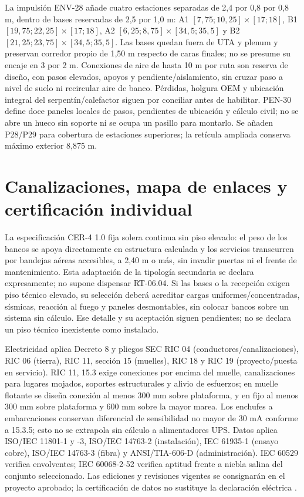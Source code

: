 La impulsión ENV-28 añade cuatro estaciones separadas de 2,4 por 0,8 por 0,8 m, dentro de bases reservadas de 2,5 por 1,0 m: A1 $[7,75;10,25]\times[17;18]$, B1 $[19,75;22,25]\times[17;18]$, A2 $[6,25;8,75]\times[34,5;35,5]$ y B2 $[21,25;23,75]\times[34,5;35,5]$. Las bases quedan fuera de UTA y plenum y preservan corredor propio de 1,50 m respecto de caras finales; no se presume su encaje en 3 por 2 m. Conexiones de aire de hasta 10 m por ruta son reserva de diseño, con pasos elevados, apoyos y pendiente/aislamiento, sin cruzar paso a nivel de suelo ni recircular aire de banco. Pérdidas, holgura OEM y ubicación integral del serpentín/calefactor siguen por conciliar antes de habilitar. PEN-30 define doce paneles locales de pasos, pendientes de ubicación y cálculo civil; no se abre un hueco sin soporte ni se ocupa un pasillo para montarlo. Se añaden P28/P29 para cobertura de estaciones superiores; la retícula ampliada conserva máximo exterior 8,875 m.



\section{Canalizaciones, mapa de enlaces y certificación individual}
\label{sec:recinto-enlaces-certificados}
La especificación CER-4 1.0 fija solera continua sin piso elevado: el peso de los bancos se apoya directamente en estructura calculada y los servicios transcurren por bandejas aéreas accesibles, a 2,40 m o más, sin invadir puertas ni el frente de mantenimiento. Esta adaptación de la tipología secundaria se declara expresamente; no supone dispensar RT-06.04. Si las bases o la recepción exigen piso técnico elevado, su selección deberá acreditar cargas uniformes/concentradas, sísmicas, reacción al fuego y paneles desmontables, sin colocar bancos sobre un sistema sin cálculo. Ese detalle y su aceptación siguen pendientes; no se declara un piso técnico inexistente como instalado.

Electricidad aplica Decreto 8 y pliegos SEC RIC 04 (conductores/canalizaciones), RIC 06 (tierra), RIC 11, sección 15 (muelles), RIC 18 y RIC 19 (proyecto/puesta en servicio). RIC 11, 15.3 exige conexiones por encima del muelle, canalizaciones para lugares mojados, soportes estructurales y alivio de esfuerzos; en muelle flotante se diseña conexión al menos 300 mm sobre plataforma, y en fijo al menos 300 mm sobre plataforma y 600 mm sobre la mayor marea. Los enchufes a embarcaciones conservan diferencial de sensibilidad no mayor de 30 mA conforme a 15.3.5; esto no se extrapola sin cálculo a alimentadores UPS. Datos aplica ISO/IEC 11801-1 y -3, ISO/IEC 14763-2 (instalación), IEC 61935-1 (ensayo cobre), ISO/IEC 14763-3 (fibra) y ANSI/TIA-606-D (administración). IEC 60529 verifica envolventes; IEC 60068-2-52 verifica aptitud frente a niebla salina del conjunto seleccionado. Las ediciones y revisiones vigentes se consignarán en el proyecto aprobado; la certificación de datos no sustituye la declaración eléctrica \parencites{lote10-sec-ric04}[secc.~15, p.~58]{lote10-sec-ric11}{lote10-sec-ric}.

